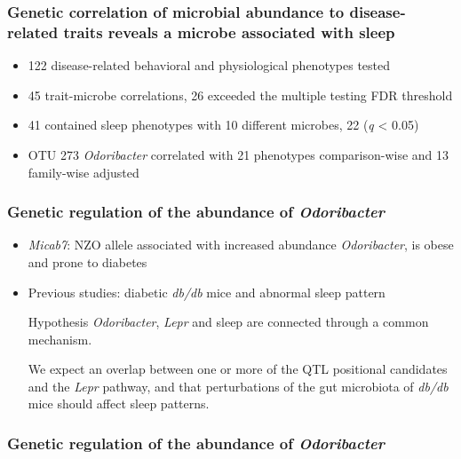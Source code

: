 \documentclass{beamer}
\begin{document}
		{

		\begin{frame}
			\frametitle{Genetic correlation of microbial abundance to disease-related traits reveals a microbe associated with sleep}
			\begin{itemize}
				\item 122 disease-related behavioral and physiological phenotypes tested
				\item 45 trait-microbe correlations, 26 exceeded the multiple testing FDR threshold
				\item 41 contained sleep phenotypes with 10 different microbes, 22 (\emph{q} < 0.05)
				\item OTU 273 \textit{Odoribacter} correlated with 21 phenotypes comparison-wise and 13 family-wise adjusted
			\end{itemize}
		\end{frame}
		
		
		\begin{frame}
			\frametitle{Genetic regulation of the abundance of \textit{Odoribacter}}
			\begin{itemize}
			\item \textit{Micab7}: NZO allele associated with increased abundance \textit{Odoribacter}, is obese and prone to diabetes
			\item Previous studies: diabetic \textit{db/db} mice and abnormal sleep pattern
				\begin{block}{Hypothesis}
				\textit{Odoribacter}, \textit{Lepr} and sleep are connected through a common mechanism. 

				\end{block}
				We expect an overlap between one or more of the QTL positional candidates and the \textit{Lepr} pathway, and that perturbations of the gut microbiota of \textit{db/db} mice should affect sleep patterns.
			\end{itemize}
			
		\end{frame}
		
		\begin{frame}
		\frametitle{Genetic regulation of the abundance of \textit{Odoribacter}}
		\begin{center}
		\smartdiagramset{descriptive items y sep=90pt}



\end{center}
\end{frame}}
\end{document}
